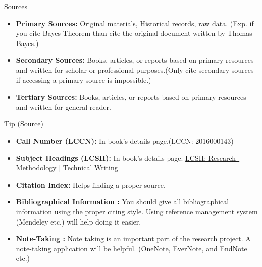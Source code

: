 \documentclass{beamer}
\begin{document}
	\begin{frame}
		\begin{block}{Sources}
		\end{block}
		\begin{itemize}
			 \item \textbf{Primary Sources:} Original materials, Historical records, raw data. (Exp. if you cite Bayes Theorem  than cite the original document written by Thomas Bayes.)
			\onslide<2-> \item \textbf{Secondary Sources:} Books, articles, or reports based on primary resources and written for scholar or professional purposes.(Only cite secondary sources if accessing a primary source is impossible.) 
			\onslide<3-> \item \textbf{Tertiary Sources:} Books, articles, or reports based on primary resources and written for general reader. 
		\end{itemize}
	\end{frame}
	

	\begin{frame}
		\begin{block}{Tip (Source)}
		\end{block}
		\begin{itemize}
			 \item \textbf{Call Number (LCCN):} In book's details page.(LCCN: 2016000143)
			\onslide<2-> \item \textbf{Subject Headings (LCSH):} In book's details page. \href{http://library.metu.edu.tr/search~S4/?searchtype=d&searcharg=research+methodolgy&searchscope=4&sortdropdown=-&SORT=DZ&extended=0&SUBMIT=Search&searchlimits=&searchorigarg=Xreaerch+methodolgy}{LCSH: Research--Methodology | Technical Writing } 
			\onslide<3-> \item \textbf{Citation Index:} Helps finding a proper source.
			\onslide<4-> \item \textbf{Bibliographical Information :} You should give all bibliographical information using the proper citing style. Using reference management system (Mendeley etc.) will help doing it easier. 
			\onslide<5-> \item \textbf{Note-Taking :} Note taking is an important part of the research project. A note-taking application will be helpful. (OneNote, EverNote, and EndNote etc.)
		\end{itemize}
	\end{frame}
\end{document}
